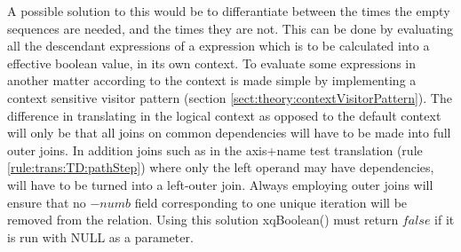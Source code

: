 A possible solution to this would be to differantiate between the times the empty sequences are needed, and the
times they are not. This can be done by evaluating all the descendant expressions of a expression which is to be
calculated into a effective boolean value, in its own context. To evaluate some expressions in another matter
according to the context is made simple by implementing a context sensitive visitor pattern (section
\ref{sect:theory:contextVisitorPattern}). The difference in translating in the logical context as opposed to the
default context will only be that all joins on common dependencies will have to be made into full outer joins. In
addition joins such as in the axis+name test translation (rule \ref{rule:trans:TD:pathStep}) where only the left
operand may have dependencies, will have to be turned into a left-outer join. Always employing outer joins will
ensure that no $-numb$ field corresponding to one unique iteration will be removed from the relation. Using this
solution \textsf{xqBoolean()} must return $false$ if it is run with \textsf{NULL} as a parameter.